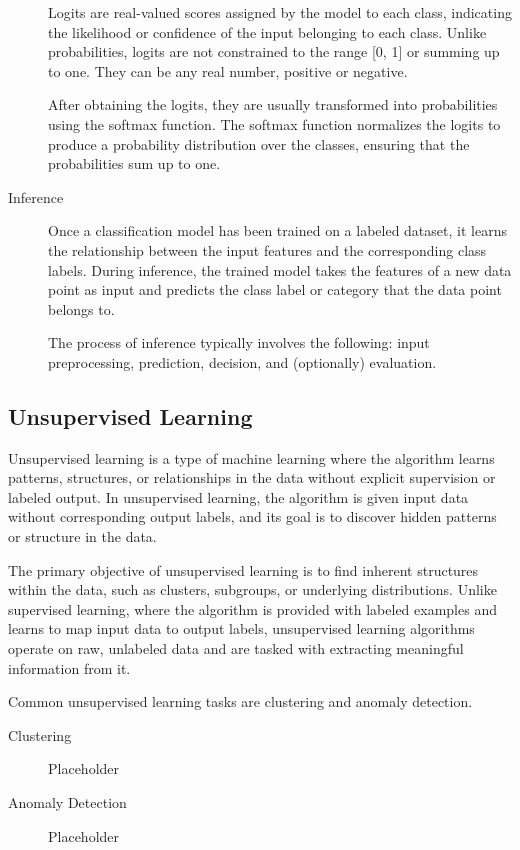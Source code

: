 \documentclass[a4paper]{article}
\begin{document}
\begin{description}
Logits are real-valued scores assigned by the model to each class, indicating the likelihood or confidence of the input belonging to each class. Unlike probabilities, logits are not constrained to the range [0, 1] or summing up to one. They can be any real number, positive or negative.

After obtaining the logits, they are usually transformed into probabilities using the softmax function. The softmax function normalizes the logits to produce a probability distribution over the classes, ensuring that the probabilities sum up to one.

\item[Inference]
Once a classification model has been trained on a labeled dataset, it learns the relationship between the input features and the corresponding class labels. During inference, the trained model takes the features of a new data point as input and predicts the class label or category that the data point belongs to.

The process of inference typically involves the following: input preprocessing, prediction, decision, and (optionally) evaluation.
\end{description}


\subsection*{Unsupervised Learning}
Unsupervised learning is a type of machine learning where the algorithm learns patterns, structures, or relationships in the data without explicit supervision or labeled output. In unsupervised learning, the algorithm is given input data without corresponding output labels, and its goal is to discover hidden patterns or structure in the data.

The primary objective of unsupervised learning is to find inherent structures within the data, such as clusters, subgroups, or underlying distributions. Unlike supervised learning, where the algorithm is provided with labeled examples and learns to map input data to output labels, unsupervised learning algorithms operate on raw, unlabeled data and are tasked with extracting meaningful information from it.

Common unsupervised learning tasks are clustering and anomaly detection.

\begin{description}
\item[Clustering]
Placeholder

\item[Anomaly Detection]
Placeholder
\end{description}
\end{document}
